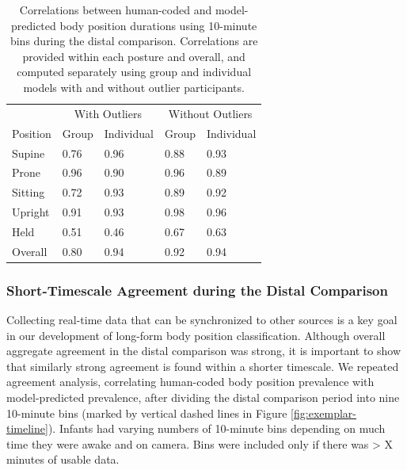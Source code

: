 \documentclass[
  man]{apa6}
\begin{document}
\begin{table}[tbp]

\begin{center}
\begin{threeparttable}

\caption{\label{tab:pt2binstable}Correlations between human-coded and model-predicted body position durations using 10-minute bins during the distal comparison. Correlations are provided within each posture and overall, and computed separately using group and individual models with and without outlier participants.}

\begin{tabular}{lllll}
\toprule
 & \multicolumn{2}{c}{With Outliers} & \multicolumn{2}{c}{Without Outliers} \\
\cmidrule(r){2-3} \cmidrule(r){4-5}
Position & Group & Individual & Group & Individual\\
\midrule
Supine & 0.76 & 0.96 & 0.88 & 0.93\\
Prone & 0.96 & 0.90 & 0.96 & 0.89\\
Sitting & 0.72 & 0.93 & 0.89 & 0.92\\
Upright & 0.91 & 0.93 & 0.98 & 0.96\\
Held & 0.51 & 0.46 & 0.67 & 0.63\\ \midrule
Overall & 0.80 & 0.94 & 0.92 & 0.94\\
\bottomrule
\end{tabular}

\end{threeparttable}
\end{center}

\end{table}

\hypertarget{short-timescale-agreement-during-the-distal-comparison}{%
\subsubsection{Short-Timescale Agreement during the Distal Comparison}\label{short-timescale-agreement-during-the-distal-comparison}}

Collecting real-time data that can be synchronized to other sources is a key goal in our development of long-form body position classification. Although overall aggregate agreement in the distal comparison was strong, it is important to show that similarly strong agreement is found within a shorter timescale. We repeated agreement analysis, correlating human-coded body position prevalence with model-predicted prevalence, after dividing the distal comparison period into nine 10-minute bins (marked by vertical dashed lines in Figure \ref{fig:exemplar-timeline}). Infants had varying numbers of 10-minute bins depending on much time they were awake and on camera. Bins were included only if there was \textgreater{} X minutes of usable data.
\end{document}
